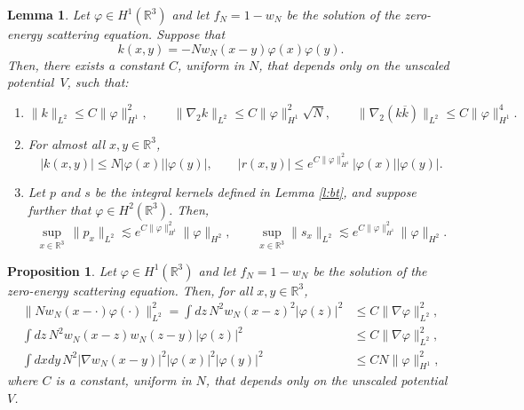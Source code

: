 \documentclass[11pt,a4paper,draft,DIV11]{scrartcl}	%
\newtheorem{prp}[thm]{Proposition}
\newtheorem{lem}[thm]{Lemma}
\newcommand{\R}{\mathds{R}}
\newcommand{\norm}[1]{\lVert#1\rVert}	%
\begin{document}
\begin{lem} \label{l:kernels}
  Let $\varphi \in H^1(\R^3)$ and let $f_N=1-w_N$ be the solution of the
  zero-energy scattering equation. Suppose that
  \[
    k(x,y) = - N w_N(x-y) \varphi(x) \varphi(y).
  \]
  Then, there exists a constant $C$, uniform in $N$, that depends only on the
  unscaled potential~$V$, such that: 
  \begin{enumerate}
    \item \label{k}
      \[
        \| k \|_{L^2} \le C \| \varphi \|_{H^1}^2, \qquad \| \nabla_2 k
        \|_{L^2} \le C \| \varphi \|_{H^1}^2 \sqrt{N}, \qquad \| \nabla_2 (k
        \overline{k}) \|_{L^2} \le C \| \varphi \|_{H^1}^4.
      \]
    \item \label{kr} For almost all $x,y \in \R^3$,
      \[
        |k(x,y)| \leq N |\varphi(x)| |\varphi(y)|, \qquad |r(x,y)| \le e^{C \|
        \varphi \|_{H^1}^2} |\varphi(x)| |\varphi(y)|.
      \] 
    \item \label{sup} Let $p$ and $s$ be the integral kernels defined in Lemma
      \ref{l:bt}, and suppose further that $\varphi \in H^2(\R^3)$. Then,
      \[
        \sup_{x \in \R^3} \, \norm{p_x}_{L^2} \apprle e^{C \| \varphi
        \|_{H^1}^2} \norm{\varphi}_{H^2}, \qquad \sup_{x \in \R^3}
        \norm{s_x}_{L^2} \apprle e^{C \| \varphi \|_{H^1}^2}
        \norm{\varphi}_{H^2}.
      \]
  \end{enumerate}
\end{lem}


\begin{prp} \label{p:wphi}
  Let $\varphi \in H^1(\R^3)$ and let $f_N=1-w_N$ be the solution of the
  zero-energy scattering equation. Then, for all $x,y \in \R^3$,
  \begin{align*}
    \norm{N w_N(x-\cdot)\varphi(\cdot)}_{L^2}^2 = \int dz \, N^2 w_N(x-z)^2 |\varphi(z)|^2 & \le C \| \nabla \varphi
    \|_{L^2}^2, \\
\int dz \, N^2 w_N(x-z) w_N(z-y) |\varphi(z)|^2 & \le C \| \nabla \varphi
    \|_{L^2}^2, \\
    \int dx dy \, N^2 |\nabla w_N(x-y)|^2 |\varphi(x)|^2 |\varphi(y)|^2 & \le
    C N \| \varphi \|_{H^1}^2,
  \end{align*}
  where $C$ is a constant, uniform in $N$, that depends only on the unscaled
  potential $V$.
\end{prp}
\end{document}
